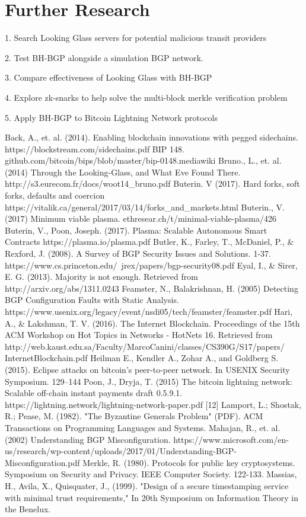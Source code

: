 \documentclass[letterpaper, 10 pt, conference]{ieeeconf}  %
\begin{document}
\section{Further Research}
1. Search Looking Glass servers for potential malicious transit providers

2. Test BH-BGP alongside a simulation BGP network.

3. Compare effectiveness of Looking Glass with BH-BGP

4. Explore zk-snarks to help solve the multi-block merkle verification problem

5. Apply BH-BGP to Bitcoin Lightning Network protocols

\begin{thebibliography}{99}

Back, A., et. al. (2014). Enabling blockchain innovations with pegged sidechains. https://blockstream.com/sidechains.pdf
 BIP 148. github.com/bitcoin/bips/blob/master/bip-0148.mediawiki
 Bruno., L., et. al. (2014) Through the Looking-Glass, and What Eve Found There. http://s3.eurecom.fr/docs/woot14\_bruno.pdf
 Buterin. V (2017). Hard forks, soft forks, defaults and coercion https://vitalik.ca/general/2017/03/14/forks\_and\_markets.html
 Buterin., V. (2017) Minimum viable plasma. ethresear.ch/t/minimal-viable-plasma/426
 Buterin, V., Poon, Joseph. (2017). Plasma: Scalable Autonomous Smart Contracts https://plasma.io/plasma.pdf
 Butler, K., Farley, T., McDaniel, P., \& Rexford, J. (2008). A
Survey of BGP Security Issues and Solutions. 1-37. https://www.cs.princeton.edu/~jrex/papers/bgp-security08.pdf
 Eyal, I., \& Sirer, E. G. (2013). Majority is not enough. Retrieved from http://arxiv.org/abs/1311.0243
Feamster, N., Balakrishnan, H. (2005) Detecting BGP Configuration Faults with Static Analysis. https://www.usenix.org/legacy/event/nsdi05/tech/feamster/feamster.pdf
 Hari, A., \& Lakshman, T. V. (2016). The Internet Blockchain. Proceedings of the 15th ACM Workshop on Hot Topics in Networks - HotNets 16. Retrieved from http://web.kaust.edu.sa/Faculty/MarcoCanini/classes/CS390G/S17/papers/
InternetBlockchain.pdf
 Heilman E., Kendler A., Zohar A., and Goldberg S. (2015). Eclipse attacks on bitcoin’s peer-to-peer network. In USENIX Security Symposium. 129–144
 Poon, J., Dryja, T. (2015) The bitcoin lightning network: Scalable off-chain instant payments draft 0.5.9.1. https://lightning.network/lightning-network-paper.pdf
[12] Lamport, L.; Shostak, R.; Pease, M. (1982). "The Byzantine Generals Problem" (PDF). ACM Transactions on Programming Languages and Systems.
 Mahajan, R., et. al. (2002) Understanding BGP Misconfiguration. https://www.microsoft.com/en-us/research/wp-content/uploads/2017/01/Understanding-BGP-Misconfiguration.pdf
 Merkle, R. (1980). Protocols for public key cryptosystems. Symposium on Security and Privacy. IEEE Computer Society. 122-133.
 Massias, H., Avila, X., Quisquater, J., (1999). "Design of a secure timestamping service with minimal trust requirements," In 20th Symposium on Information Theory in the Benelux.


\end{thebibliography}
\end{document}
